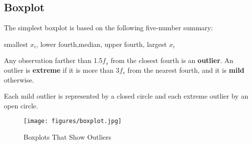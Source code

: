 \subsection{Boxplot}
The simplest boxplot is based on the following five-number summary:

smallest $x_i$, \quad lower fourth,\quad median, \quad upper fourth, \quad largest $x_i$

\begin{defn}
Any observation farther than 1.5$f_s$ from the closest fourth is an \textbf{outlier}. An outlier is \textbf{extreme} if it is more than 3$f_s$ from the nearest fourth, and it is \textbf{mild} otherwise.
\end{defn}

Each mild outlier is represented by a closed circle and each extreme outlier by an open circle.

\begin{figure}[H]
\centering
\texttt{[image: figures/boxplot.jpg]}
\caption{Boxplots That Show Outliers}
\label{fig:3}
\end{figure}
